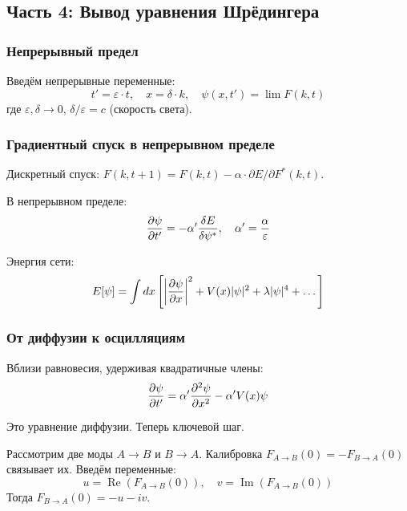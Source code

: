 \documentclass[12pt,a4paper]{article}
\begin{document}
\subsection{Часть 4: Вывод уравнения Шрёдингера}

\subsubsection{Непрерывный предел}

Введём непрерывные переменные:
\begin{equation}
    t' = \varepsilon \cdot t, \quad x = \delta \cdot k, \quad \psi(x, t') = \lim F(k, t)
\end{equation}
где $\varepsilon, \delta \to 0$, $\delta/\varepsilon = c$ (скорость света).

\subsubsection{Градиентный спуск в непрерывном пределе}

Дискретный спуск: $F(k, t+1) = F(k, t) - \alpha \cdot \partial E / \partial F^*(k, t)$.

В непрерывном пределе:
\begin{equation}
    \pdv{\psi}{t'} = -\alpha' \frac{\delta E}{\delta \psi^*}, \quad \alpha' = \frac{\alpha}{\varepsilon}
\end{equation}

Энергия сети:
\begin{equation}
    E[\psi] = \int dx \left[ \left| \pdv{\psi}{x} \right|^2 + V(x)|\psi|^2 + \lambda|\psi|^4 + \dots \right]
\end{equation}

\subsubsection{От диффузии к осцилляциям}

Вблизи равновесия, удерживая квадратичные члены:
\begin{equation}
    \pdv{\psi}{t'} = \alpha' \pdv[2]{\psi}{x} - \alpha' V(x) \psi
\end{equation}

Это уравнение диффузии. Теперь ключевой шаг.

Рассмотрим две моды $A \to B$ и $B \to A$. Калибровка $F_{A \to B}(0) = -F_{B \to A}(0)$ связывает их. Введём переменные:
\begin{equation}
    u = \operatorname{Re}(F_{A \to B}(0)), \quad v = \operatorname{Im}(F_{A \to B}(0))
\end{equation}
Тогда $F_{B \to A}(0) = -u - iv$.
\end{document}
